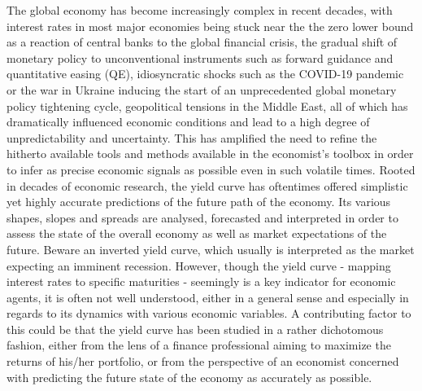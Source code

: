 The global economy has become increasingly complex in recent decades, with interest rates in most major economies being stuck near the the zero lower bound as a reaction of central banks to the global financial crisis, the gradual shift of monetary policy to unconventional instruments such as forward guidance and quantitative easing (QE), idiosyncratic shocks such as the COVID-19 pandemic or the war in Ukraine inducing the start of an unprecedented global monetary policy tightening cycle, geopolitical tensions in the Middle East, all of which has dramatically influenced economic conditions and lead to a high degree of unpredictability and uncertainty. 
This has amplified the need to refine the hitherto available tools and methods available in the economist's toolbox in order to infer as precise economic signals as possible even in such volatile times.
Rooted in decades of economic research, the yield curve has oftentimes offered simplistic yet highly accurate predictions of the future path of the economy. 
Its various shapes, slopes and spreads are analysed, forecasted and interpreted in order to assess the state of the overall economy as well as market expectations of the future.
Beware an inverted yield curve, which usually is interpreted as the market expecting an imminent recession.
However, though the yield curve - mapping interest rates to specific maturities - seemingly is a key indicator for economic agents, it is often not well understood, either in a general sense and especially in regards to its dynamics with various economic variables.
A contributing factor to this could be that the yield curve has been studied in a rather dichotomous fashion, either from the lens of a finance professional aiming to maximize the returns of his/her portfolio, or from the perspective of an economist concerned with predicting the future state of the economy as accurately as possible. 
